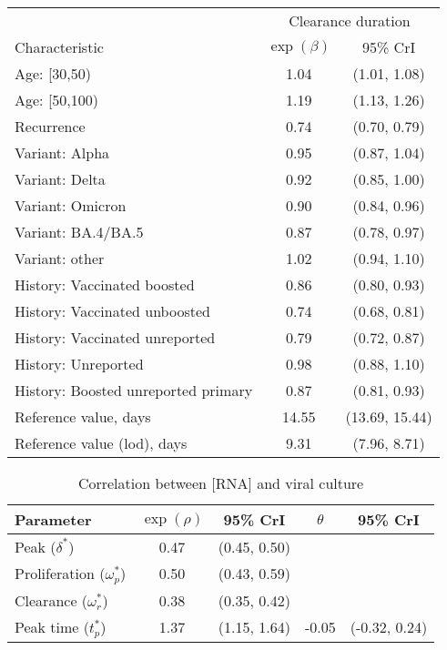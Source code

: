 \documentclass[11pt]{article}
\begin{document}
\begin{table}[p]
 \begin{table}[p]
    \centering
    \begin{tabular}{lcc}
     \toprule
     & \multicolumn{2}{c}{Clearance duration} \\
     Characteristic & $\exp(\beta)$ & 95\% CrI\\
     \midrule
     Age: [30,50) & 1.04 & (1.01, 1.08)\\
     Age: [50,100) & 1.19 & (1.13, 1.26)\\
     Recurrence & 0.74 & (0.70, 0.79)\\
     Variant: Alpha & 0.95 & (0.87, 1.04)\\
     Variant: Delta & 0.92 & (0.85, 1.00)\\
     Variant: Omicron & 0.90 & (0.84, 0.96)\\
     Variant: BA.4/BA.5 & 0.87 & (0.78, 0.97)\\
     Variant: other & 1.02 & (0.94, 1.10)\\
     History: Vaccinated boosted & 0.86 & (0.80, 0.93)\\
     History: Vaccinated unboosted & 0.74 & (0.68, 0.81)\\
     History: Vaccinated unreported & 0.79 & (0.72, 0.87)\\
     History: Unreported & 0.98 & (0.88, 1.10)\\
     History: Boosted unreported primary & 0.87 & (0.81, 0.93)\\
     \midrule
     Reference value, days & 14.55 & (13.69, 15.44)\\
     Reference value (lod), days & 9.31 & (7.96, 8.71)\\
     \bottomrule
     \end{tabular}
\end{table}
\end{table}

\begin{table}[p]
    \centering
    \caption{Correlation between [RNA] and viral culture}
    \begin{tabular}{lcccc}
     \toprule
     Parameter & $\exp(\rho)$ & 95\% CrI & $\theta$ & 95\% CrI\\
     \midrule
     Peak ($\delta^*$) & 0.47 & (0.45, 0.50) &  & \\
     Proliferation ($\omega_p^*$) & 0.50 & (0.43, 0.59) &  & \\
     Clearance ($\omega_r^*$) & 0.38 & (0.35, 0.42) &  & \\
     \midrule
     Peak time ($t_p^*$) & 1.37 & (1.15, 1.64) & -0.05 & (-0.32, 0.24)\\
     \bottomrule
     \end{tabular}
    \label{tab:corr}
\end{table}
\end{document}
